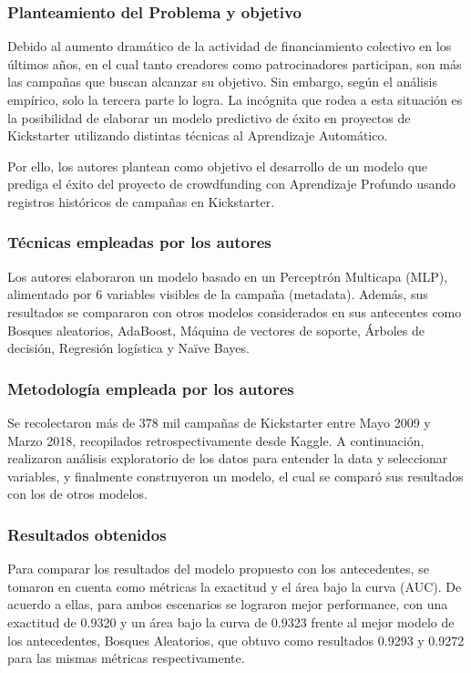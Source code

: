 \subsubsection{Planteamiento del Problema y objetivo}
Debido al aumento dramático de la actividad de financiamiento colectivo en los últimos años, en el cual tanto creadores como patrocinadores participan, son más las campañas que buscan alcanzar su objetivo. Sin embargo, según el análisis empírico, solo la tercera parte lo logra. La incógnita que rodea a esta situación es la posibilidad de elaborar un modelo predictivo de éxito en proyectos de Kickstarter utilizando distintas técnicas al Aprendizaje Automático.

Por ello, los autores plantean como objetivo el desarrollo de un modelo que prediga el éxito del proyecto de crowdfunding con Aprendizaje Profundo usando registros históricos de campañas en Kickstarter.

\subsubsection{Técnicas empleadas por los autores}
Los autores elaboraron un modelo basado en un Perceptrón Multicapa (MLP), alimentado por 6 variables visibles de la campaña (metadata). Además, sus resultados se compararon con otros modelos considerados en sus antecentes como Bosques aleatorios, AdaBoost, Máquina de vectores de soporte, Árboles de decisión, Regresión logística y Naïve Bayes.

\subsubsection{Metodología empleada por los autores}
Se recolectaron más de 378 mil campañas de Kickstarter entre Mayo 2009 y Marzo 2018, recopilados retrospectivamente desde Kaggle. A continuación, realizaron análisis exploratorio de los datos para entender la data y seleccionar variables, y finalmente construyeron un modelo, el cual se comparó sus resultados con los de otros modelos.

\subsubsection{Resultados obtenidos}
Para comparar los resultados del modelo propuesto con los antecedentes, se tomaron en cuenta como métricas la exactitud y el área bajo la curva (AUC). De acuerdo a ellas, para ambos escenarios se lograron mejor performance, con una exactitud de 0.9320 y un área bajo la curva de 0.9323 frente al mejor modelo de los antecedentes, Bosques Aleatorios, que obtuvo como resultados 0.9293 y 0.9272 para las mismas métricas respectivamente.

